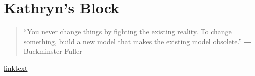 \section{Kathryn's Block}
\begin{quote}
“You never change things by fighting the existing reality.
To change something, build a new model that makes the existing model obsolete.” 
― Buckminster Fuller
\end{quote}
\href{https://www.goodreads.com/author/quotes/165737.Buckminster_Fuller}{linktext}
